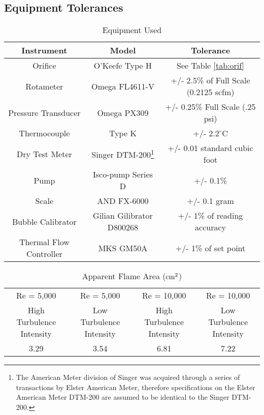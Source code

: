 \documentclass[paper=letter, fontsize=10pt]{scrartcl} %
\begin{document}
\clearpage
\begin{appendices}
\setcounter{equation}{0}
\section{Equipment Tolerances}\label{app:Equip}

\begin{table}[h]
\begin{center}
\begin{tabular}{ | c  c  c |}
 \hline
 Instrument & Model & Tolerance \\
 \hline\hline
 Orifice & O'Keefe Type H & See Table \ref{tab:orif} \\
 \hline
 Rotameter & Omega FL4611-V & +/- 2.5\% of Full Scale (0.2125 scfm)\\
 \hline
 Pressure Transducer & Omega PX309 & +/- 0.25\% Full Scale (.25 psi) \\
 \hline
 Thermocouple & Type K & +/- \(2.2^\circ\)C \\
 \hline
 Dry Test Meter & Singer DTM-200\footnote{The American Meter division of Singer was acquired through a series of transactions by Elster American Meter, therefore specifications on the Elster American Meter DTM-200 are assumed to be identical to the Singer DTM-200.} & +/- 0.01 standard cubic foot \\
 \hline
 Pump & Isco-pump Series D & +/- 0.1\% \\
 \hline
 Scale & AND FX-6000 & +/- 0.1 gram \\
 \hline
 Bubble Calibrator & Gilian Gilibrator D800268 & +/- 1\% of reading accuracy \\
 \hline
 Thermal Flow Controller & MKS GM50A & +/- 1\% of set point \\
 \hline
\end{tabular}
\end{center}
\caption{Equipment Used}\label{tab:tol}
\end{table}

\begin{table}[h]
\begin{center}
\begin{tabular}{ | c | c | c | c|}
 \hline
 Re = 5,000 & Re = 5,000 & Re = 10,000 & Re = 10,000 \\
 High Turbulence Intensity & Low Turbulence Intensity & High Turbulence Intensity & Low Turbulence Intensity \\
\hline
 3.29 & 3.54 & 6.81 & 7.22\\
 \hline
\end{tabular}
\end{center}
\caption{Apparent Flame Area ($\textnormal{cm}^2$)}\label{tab:flameareas}
\end{table}


\end{appendices}
\end{document}
